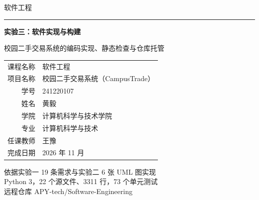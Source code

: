 \documentclass[UTF8,a4paper,11pt]{ctexart}
\begin{document}

\begin{titlepage}
\thispagestyle{empty}
\begin{center}
\vspace*{1.6cm}

{\heiti 软\quad 件\quad 工\quad 程}\\[6pt]
{\color{accent}\rule{3.6cm}{0.9pt}}

\vspace{1.5cm}
{\heiti\bfseries 实验三：软件实现与构建}

\vspace{0.9cm}
{\kaishu 校园二手交易系统的编码实现、静态检查与仓库托管}

\vspace{2.2cm}

\renewcommand{\arraystretch}{1.75}
{\songti
\begin{tabular}{r@{\hspace{0.7em}}l}
\toprule
课程名称 & 软件工程 \\
项目名称 & 校园二手交易系统（CampusTrade）\\
学\qquad 号 & 241220107 \\
姓\qquad 名 & 黄\quad 毅 \\
学\qquad 院 & 计算机科学与技术学院 \\
专\qquad 业 & 计算机科学与技术 \\
任课教师 & 王\quad 豫 \\
完成日期 & 2026 年 11 月 \\
\bottomrule
\end{tabular}
}

\vfill
{\songti\color{gray}
依据实验一 19 条需求与实验二 6 张 UML 图实现\\
Python 3，22 个源文件、3311 行，73 个单元测试\\
远程仓库 APY-tech/Software-Engineering}
\end{center}
\end{titlepage}

\setcounter{page}{1}
\setcounter{tocdepth}{1}
\tableofcontents
\clearpage
{}
\setcounter{page}{1}







\end{document}

